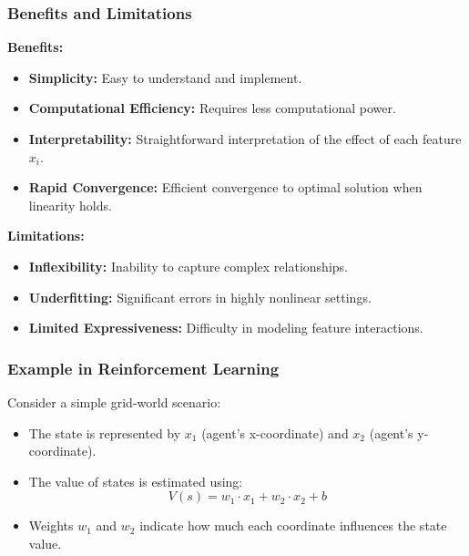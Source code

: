 \documentclass[aspectratio=169]{beamer}
\begin{document}
\begin{frame}[fragile]
    \frametitle{Benefits and Limitations}
    \textbf{Benefits:}
    \begin{itemize}
        \item \textbf{Simplicity:} Easy to understand and implement.
        \item \textbf{Computational Efficiency:} Requires less computational power.
        \item \textbf{Interpretability:} Straightforward interpretation of the effect of each feature \(x_i\).
        \item \textbf{Rapid Convergence:} Efficient convergence to optimal solution when linearity holds.
    \end{itemize}
    
    \bigskip
    
    \textbf{Limitations:}
    \begin{itemize}
        \item \textbf{Inflexibility:} Inability to capture complex relationships.
        \item \textbf{Underfitting:} Significant errors in highly nonlinear settings.
        \item \textbf{Limited Expressiveness:} Difficulty in modeling feature interactions.
    \end{itemize}
\end{frame}

\begin{frame}[fragile]
    \frametitle{Example in Reinforcement Learning}
    Consider a simple grid-world scenario:
    \begin{itemize}
        \item The state is represented by \(x_1\) (agent's x-coordinate) and \(x_2\) (agent's y-coordinate).
        \item The value of states is estimated using:
        \begin{equation}
        V(s) = w_1 \cdot x_1 + w_2 \cdot x_2 + b
        \end{equation}
        \item Weights \(w_1\) and \(w_2\) indicate how much each coordinate influences the state value.
    \end{itemize}
\end{frame}
\end{document}
